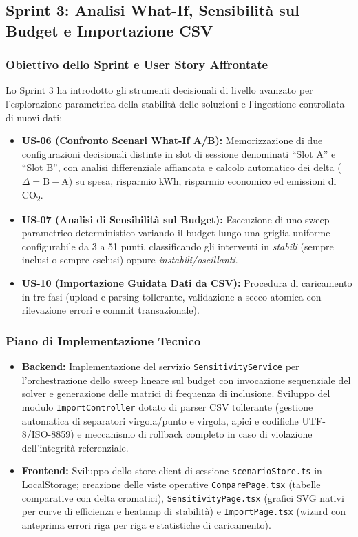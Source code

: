 \subsection{Sprint 3: Analisi What-If, Sensibilità sul Budget e Importazione CSV}

\subsubsection{Obiettivo dello Sprint e User Story Affrontate}
Lo Sprint 3 ha introdotto gli strumenti decisionali di livello avanzato per l'esplorazione parametrica della stabilità delle soluzioni e l'ingestione controllata di nuovi dati:
\begin{itemize}[leftmargin=1.5em, itemsep=0.2em]
    \item \textbf{US-06 (Confronto Scenari What-If A/B):} Memorizzazione di due configurazioni decisionali distinte in slot di sessione denominati ``Slot A'' e ``Slot B'', con analisi differenziale affiancata e calcolo automatico dei delta ($\Delta = \text{B} - \text{A}$) su spesa, risparmio kWh, risparmio economico ed emissioni di CO\textsubscript{2}.
    \item \textbf{US-07 (Analisi di Sensibilità sul Budget):} Esecuzione di uno sweep parametrico deterministico variando il budget lungo una griglia uniforme configurabile da 3 a 51 punti, classificando gli interventi in \emph{stabili} (sempre inclusi o sempre esclusi) oppure \emph{instabili/oscillanti}.
    \item \textbf{US-10 (Importazione Guidata Dati da CSV):} Procedura di caricamento in tre fasi (upload e parsing tollerante, validazione a secco atomica con rilevazione errori e commit transazionale).
\end{itemize}

\subsubsection{Piano di Implementazione Tecnico}
\begin{itemize}[leftmargin=1.4em, itemsep=0.2em]
    \item \textbf{Backend:} Implementazione del servizio \texttt{SensitivityService} per l'orchestrazione dello sweep lineare sul budget con invocazione sequenziale del solver e generazione delle matrici di frequenza di inclusione. Sviluppo del modulo \texttt{ImportController} dotato di parser CSV tollerante (gestione automatica di separatori virgola/punto e virgola, apici e codifiche UTF-8/ISO-8859) e meccanismo di rollback completo in caso di violazione dell'integrità referenziale.
    \item \textbf{Frontend:} Sviluppo dello store client di sessione \texttt{scenarioStore.ts} in LocalStorage; creazione delle viste operative \texttt{ComparePage.tsx} (tabelle comparative con delta cromatici), \texttt{SensitivityPage.tsx} (grafici SVG nativi per curve di efficienza e heatmap di stabilità) e \texttt{ImportPage.tsx} (wizard con anteprima errori riga per riga e statistiche di caricamento).
\end{itemize}

